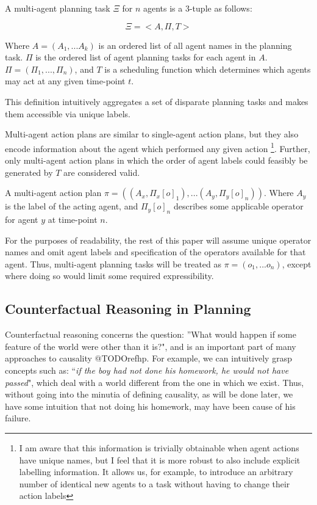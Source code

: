 \documentclass{article}
\theoremstyle{plain}
\theoremstyle{definition}
\begin{document}
A multi-agent planning task $\Xi$ for $n$ agents is a 3-tuple as follows:

\[
\Xi = <A, \Pi, T>
\]

 Where $A=(A_1,...A_k)$ is an ordered list of all agent names in the planning task. $\Pi$ is the ordered list of agent planning tasks for each agent in $A$. $\Pi=(\Pi_1,...,\Pi_n)$, and $T$ is a scheduling function which determines which agents may act at any given time-point $t$.
 
This definition intuitively aggregates a set of disparate planning tasks and makes them accessible via unique labels.

Multi-agent action plans are similar to single-agent action plans, but they also encode information about the agent which performed any given action \footnote{I am aware that this information is trivially obtainable when agent actions have unique names, but I feel that it is more robust to also include explicit labelling information. It allows us, for example, to introduce an arbitrary number of identical new agents to a task without having to change their action labels}. Further, only multi-agent action plans in which the order of agent labels could feasibly be generated by $T$ are considered valid.

A multi-agent action plan $\pi=((A_x, \Pi_x[o]_1),...(A_y, \Pi_y[o]_n))$. Where $A_y$ is the label of the acting agent, and $\Pi_y[o]_n$ describes some applicable operator for agent $y$ at time-point $n$.

For the purposes of readability, the rest of this paper will assume unique operator names and omit agent labels and specification of the operators available for that agent. Thus, multi-agent planning tasks will be treated as $\pi=(o_1,...o_n)$, except where doing so would limit some required expressibility. 

\subsection{Counterfactual Reasoning in Planning}

Counterfactual reasoning concerns the question: ''What would happen if some feature of the world were other than it is?", and is an important part of many approaches to causality @TODOrefhp. For example, we can intuitively grasp concepts such as: ``\textit{if the boy had not done his homework, he would not have passed}", which deal with a world different from the one in which we exist. Thus, without going into the minutia of defining causality, as will be done later, we have some intuition that not doing his homework, may have been cause of his failure.
\end{document}
